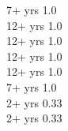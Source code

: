 
 {7+ yrs} {1.0} \\[-8pt]

 {12+ yrs} {1.0} \\[-8pt]

 {12+ yrs} {1.0} \\[-8pt]

 {12+ yrs} {1.0} \\[-8pt]

 {12+ yrs} {1.0} \\[-8pt]

 {7+ yrs} {1.0} \\[-8pt]

 {2+ yrs} {0.33} \\[-8pt]

 {2+ yrs} {0.33} \\[-8pt]

